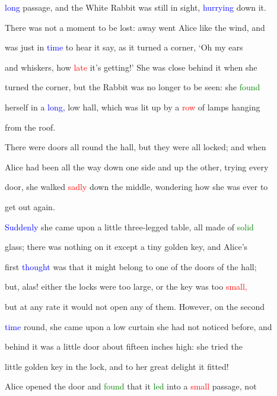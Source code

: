  \textcolor{blue}{long} passage, and the \textcolor{BurntOrange}{White} Rabbit was still in sight, \textcolor{blue}{hurrying} down it.

 There was not a moment to be \textcolor{BurntOrange}{lost:} away went Alice like the wind, and

 was just in \textcolor{blue}{time} to hear it say, as it turned a corner, ‘Oh my ears

 and whiskers, how \textcolor{red}{late} it’s getting!’ She was close behind it when she

 turned the corner, but the Rabbit was no longer to be seen: she \textcolor{green}{found}

 herself in a \textcolor{blue}{long,} low hall, which was lit up by a \textcolor{red}{row} of lamps hanging

 from the roof.



 There were doors all round the hall, but they were all locked; and when

 Alice had been all the way down one side and up the other, trying every

 door, she walked \textcolor{red}{sadly} down the middle, wondering how she was ever to

 get out again.



 \textcolor{blue}{Suddenly} she came upon a little three-legged table, all made of \textcolor{green}{solid}

 glass; there was nothing on it except a tiny golden key, and Alice’s

 first \textcolor{blue}{thought} was that it might belong to one of the doors of the hall;

 but, alas! either the locks were too large, or the key was too \textcolor{red}{small,}

 but at any rate it would not open any of them. However, on the second

 \textcolor{blue}{time} round, she came upon a low curtain she had not noticed before, and

 behind it was a little door about fifteen inches high: she tried the

 little golden key in the lock, and to her great \textcolor{BurntOrange}{delight} it fitted!



 Alice opened the door and \textcolor{green}{found} that it \textcolor{green}{led} into a \textcolor{red}{small} passage, not

